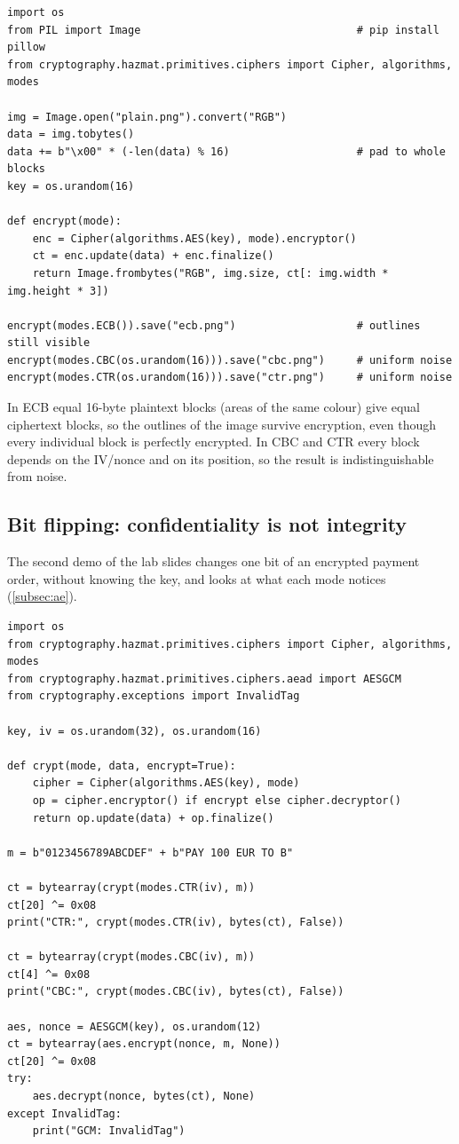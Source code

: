 \begin{verbatim}
import os
from PIL import Image                                  # pip install pillow
from cryptography.hazmat.primitives.ciphers import Cipher, algorithms, modes

img = Image.open("plain.png").convert("RGB")
data = img.tobytes()
data += b"\x00" * (-len(data) % 16)                    # pad to whole blocks
key = os.urandom(16)

def encrypt(mode):
    enc = Cipher(algorithms.AES(key), mode).encryptor()
    ct = enc.update(data) + enc.finalize()
    return Image.frombytes("RGB", img.size, ct[: img.width * img.height * 3])

encrypt(modes.ECB()).save("ecb.png")                   # outlines still visible
encrypt(modes.CBC(os.urandom(16))).save("cbc.png")     # uniform noise
encrypt(modes.CTR(os.urandom(16))).save("ctr.png")     # uniform noise
\end{verbatim}

In ECB equal 16-byte plaintext blocks (areas of the same colour) give equal ciphertext blocks, so the outlines of the image survive encryption, even though every individual block is perfectly encrypted. In CBC and CTR every block depends on the IV/nonce and on its position, so the result is indistinguishable from noise.

\subsection{Bit flipping: confidentiality is not integrity}

The second demo of the lab slides changes one bit of an encrypted payment order, without knowing the key, and looks at what each mode notices (\cref{subsec:ae}).

\begin{verbatim}
import os
from cryptography.hazmat.primitives.ciphers import Cipher, algorithms, modes
from cryptography.hazmat.primitives.ciphers.aead import AESGCM
from cryptography.exceptions import InvalidTag

key, iv = os.urandom(32), os.urandom(16)

def crypt(mode, data, encrypt=True):
    cipher = Cipher(algorithms.AES(key), mode)
    op = cipher.encryptor() if encrypt else cipher.decryptor()
    return op.update(data) + op.finalize()

m = b"0123456789ABCDEF" + b"PAY 100 EUR TO B"

ct = bytearray(crypt(modes.CTR(iv), m))
ct[20] ^= 0x08
print("CTR:", crypt(modes.CTR(iv), bytes(ct), False))

ct = bytearray(crypt(modes.CBC(iv), m))
ct[4] ^= 0x08
print("CBC:", crypt(modes.CBC(iv), bytes(ct), False))

aes, nonce = AESGCM(key), os.urandom(12)
ct = bytearray(aes.encrypt(nonce, m, None))
ct[20] ^= 0x08
try:
    aes.decrypt(nonce, bytes(ct), None)
except InvalidTag:
    print("GCM: InvalidTag")
\end{verbatim}

